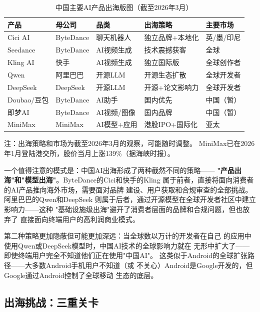\begin{table}[htbp]
\centering
\caption{中国主要AI产品出海版图（截至2026年3月）}
\label{tab:china-ai-global}
\small
\begin{tabularx}{\textwidth}{llXll}
\toprule
\rowcolor{figLightGray}
\textbf{产品} & \textbf{母公司} & \textbf{品类} &
  \textbf{出海策略} & \textbf{主要市场} \\
\midrule
Cici AI & ByteDance & 聊天机器人 & 独立品牌+本地化 & 英/墨/印尼 \\
Seedance & ByteDance & AI视频生成 & 技术震撼获客 & 全球 \\
Kling AI & 快手 & AI视频生成 & 独立国际版 & 全球创作者 \\
Qwen & 阿里巴巴 & 开源LLM & 开源生态扩散 & 全球开发者 \\
DeepSeek & DeepSeek & 开源LLM & 开源+论文影响力 & 全球开发者 \\
Doubao/豆包 & ByteDance & AI助手 & 国内优先 & 中国（暂） \\
即梦AI & ByteDance & AI视频/图像 & 国内品牌 & 中国（暂） \\
MiniMax & MiniMax & AI模型+应用 & 港股IPO+国际化 & 亚太 \\
\bottomrule
\end{tabularx}

\medskip
\footnotesize
注：出海策略和市场为截至2026年3月的观察，可能随时调整。
MiniMax已在2026年1月登陆港交所，股价当月上涨139\%（据海峡时报）。
\end{table}

一个值得注意的模式是：中国AI出海形成了两种截然不同的策略——
\textbf{"产品出海"和"模型出海"}。ByteDance的Cici和快手的Kling
属于前者，直接将面向消费者的AI产品推向海外市场，需要面对品牌
建设、用户获取和合规审查的全部挑战。阿里巴巴的Qwen和DeepSeek
则属于后者，通过开源模型在全球开发者社区中建立影响力——这种
"基础设施级出海"避开了消费者层面的品牌和合规问题，但也放弃了
直接面向终端用户的高利润商业模式。

第二种策略更加隐蔽但可能更加深远：当全球数以万计的开发者在自己
的应用中使用Qwen或DeepSeek模型时，中国AI技术的全球影响力就在
无形中扩大了——即使终端用户完全不知道他们正在使用"中国AI"。
这类似于Android的全球扩张路径——大多数Android手机用户不知道（或
不关心）Android是Google开发的，但Google通过Android控制了全球移动
生态的底层。


\subsection{出海挑战：三重关卡}
\label{subsec:outlook-going-global-challenges}

